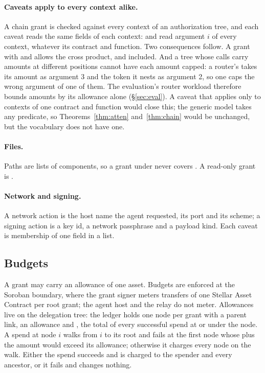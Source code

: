 \paragraph{Caveats apply to every context alike.} A chain grant is checked
against every context of an authorization tree, and each caveat reads the same
fields of each context:  and  read
argument $i$ of every context, whatever its contract and
function. Two consequences follow. A grant with
 and  allows the
cross product,  and  included. And a tree whose
calls carry amounts at different positions cannot have each amount capped: a
router's  takes its amount as argument 3 and the token
 it nests as argument 2, so one  caps the
wrong argument of one of them. The evaluation's router workload therefore
bounds amounts by its allowance alone (\S\ref{sec:eval}). A caveat that
applies only to contexts of one contract and function would close this; the
generic model takes any predicate, so Theorems~\ref{thm:atten}
and~\ref{thm:chain} would be unchanged, but the vocabulary does not have one.

\paragraph{Files.} Paths are lists of components, so a grant under
 never covers . A
read-only grant is .

\paragraph{Network and signing.} A network action is the host name the agent
requested, its port and its scheme; a signing action is a key id, a network
passphrase and a payload kind. Each caveat is membership of one field in a
list.

\subsection{Budgets}\label{sec:budgets}

A grant may carry an allowance of one asset. Budgets are enforced at the
Soroban boundary, where the grant signer meters transfers of one Stellar Asset
Contract per root grant; the agent host and the relay do not meter.
Allowances live on the delegation tree: the ledger holds one node per grant with a parent link, an
allowance and , the total of every successful spend at or under
the node. A spend at node $i$ walks from $i$ to its root and fails at the
first node whose  plus the amount would exceed its allowance;
otherwise it charges every node on the walk. Either the spend succeeds and is
charged to the spender and every ancestor, or it fails and changes nothing.

